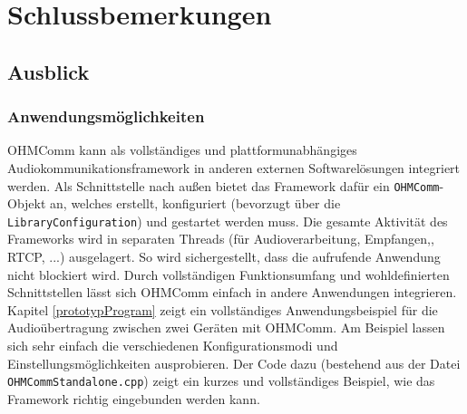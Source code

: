 \chapter{Schlussbemerkungen}

\section{Ausblick}

\subsection{Anwendungsmöglichkeiten}
OHMComm kann als vollständiges und plattformunabhängiges Audiokommunikationsframework in anderen externen Softwarelösungen integriert werden. Als Schnittstelle nach außen bietet das Framework dafür ein \texttt{OHMComm}-Objekt an, welches erstellt, konfiguriert (bevorzugt über die \texttt{LibraryConfiguration}) und gestartet werden muss. Die gesamte Aktivität des Frameworks wird in separaten Threads (für Audioverarbeitung, Empfangen,, RTCP, ...) ausgelagert. So wird sichergestellt, dass die aufrufende Anwendung nicht blockiert wird. Durch vollständigen Funktionsumfang und wohldefinierten Schnittstellen lässt sich OHMComm einfach in andere Anwendungen integrieren.
Kapitel \ref{prototypProgram} zeigt ein vollständiges Anwendungsbeispiel für die Audioübertragung zwischen zwei Geräten mit OHMComm. Am Beispiel lassen sich sehr einfach die verschiedenen Konfigurationsmodi und Einstellungsmöglichkeiten ausprobieren. Der Code dazu (bestehend aus der Datei \texttt{OHMCommStandalone.cpp}) zeigt ein kurzes und vollständiges Beispiel, wie das Framework richtig eingebunden werden kann.

